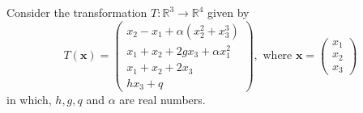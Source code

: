\documentclass[11pt]{scrartcl}
\begin{document}
\section{}
Consider the transformation $T: \mathbb{R}^{3} \rightarrow \mathbb{R}^{4}$ given by
$$
	T(\mathbf{x})=\left(\begin{array}{c}
			x_{2}-x_{1}+\alpha\left(x_{2}^{2}+x_{3}^{3}\right) \\
			x_{1}+x_{2}+2 g x_{3}+\alpha x_{1}^{2}             \\
			x_{1}+x_{2}+2 x_{3}                                \\
			h x_{3}+q
		\end{array}\right), \text { where } \mathbf{x}=\left(\begin{array}{c}
			x_{1} \\
			x_{2} \\
			x_{3}
		\end{array}\right)
$$
in which, $h, g, q$ and $\alpha$ are real numbers.
\end{document}
